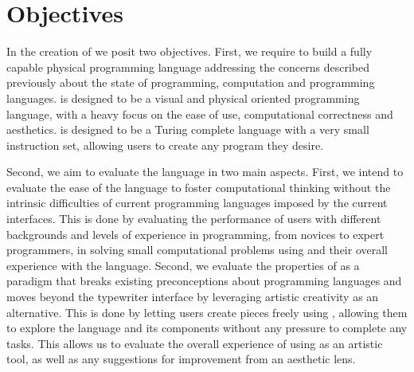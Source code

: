 \chapter{Objectives}
\label{cha:objectives}
In the creation of \sculpt we posit two objectives.
First, we require to build a fully capable physical programming language addressing the concerns described previously about the state of programming, computation and programming languages.
\sculpt is designed to be a visual and physical oriented programming language, with a heavy focus on the ease of use, computational correctness and aesthetics.
\sculpt is designed to be a Turing complete language with a very small instruction set, allowing users to create any program they desire.

Second, we aim to evaluate the language in two main aspects.
First, we intend to evaluate the ease of the language to foster computational thinking without the intrinsic difficulties of current programming languages imposed by the current interfaces.
This is done by evaluating the performance of users with different backgrounds and levels of experience in programming, from novices to expert programmers, in solving small computational problems using \sculpt
and their overall experience with the language.
Second, we evaluate the properties of \sculpt as a paradigm that breaks existing preconceptions about programming languages and moves beyond 
the typewriter interface by leveraging artistic creativity as an alternative.
This is done by letting users create pieces freely using \sculpt, allowing them to explore the language and its components without any pressure to complete any tasks.
This allows us to evaluate the overall experience of using \sculpt as an artistic tool, as well as any suggestions for improvement from an aesthetic lens.
\endinput